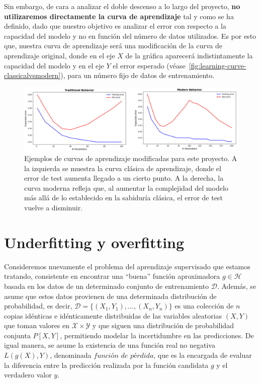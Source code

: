 Sin embargo, de cara a analizar el doble descenso a lo largo del proyecto, \textbf{no utilizaremos directamente la curva de aprendizaje} tal y como se ha definido, dado que nuestro objetivo es analizar el error con respecto a la capacidad del modelo y no en función del número de datos utilizados. Es por esto que, nuestra curva de aprendizaje será una modificación de la curva de aprendizaje original, donde en el eje $X$ de la gráfica aparecerá indistintamente la capacidad del modelo y en el eje $Y$ el error esperado (véase~\autoref{fig:learning-curve-classicalvsmodern}), para un número fijo de datos de entrenamiento.\newline

\begin{figure}[h]
    \centering
    \includegraphics[width=0.8\linewidth]{img/learning-curve-classicalvsmodern.png}
    \caption[Ejemplos de curvas de aprendizaje modificadas para este proyecto.] {Ejemplos de curvas de aprendizaje modificadas para este proyecto. A la izquierda se muestra la curva clásica de aprendizaje, donde el error de test aumenta llegado a un cierto punto. A la derecha, la curva moderna refleja que, al aumentar la complejidad del modelo más allá de lo establecido en la sabiduría clásica, el error de test vuelve a disminuir.}\label{fig:learning-curve-classicalvsmodern}
\end{figure}

\section{Underfitting y overfitting}\label{sec:subsec-underfitting-y-overfitting}

Consideremos nuevamente el problema del aprendizaje supervisado que estamos tratando, consistente en encontrar una ``buena'' función aproximadora $g \in \mathcal{H}$ basada en los datos de un determinado conjunto de entrenamiento $\mathcal{D}$. Además, se asume que estos datos provienen de una determinada distribución de probabilidad, es decir, $\mathcal{D} = \{(X_{1}, Y_{1}), \ldots, (X_{n}, Y_{n})\}$ es una colección de $n$ copias idénticas e idénticamente distribuidas de las variables aleatorias $(X, Y)$ que toman valores en $\mathcal{X} \times \mathcal{Y}$ y que siguen una distribución de probabilidad conjunta $P[X, Y]$, permitiendo modelar la incertidumbre en las predicciones. De igual manera, se asume la existencia de una función real no negativa $L(g(X), Y)$, denominada $\textit{función de pérdida}$, que es la encargada de evaluar la diferencia entre la predicción realizada por la función candidata $g$ y el verdadero valor $y$.\newline

